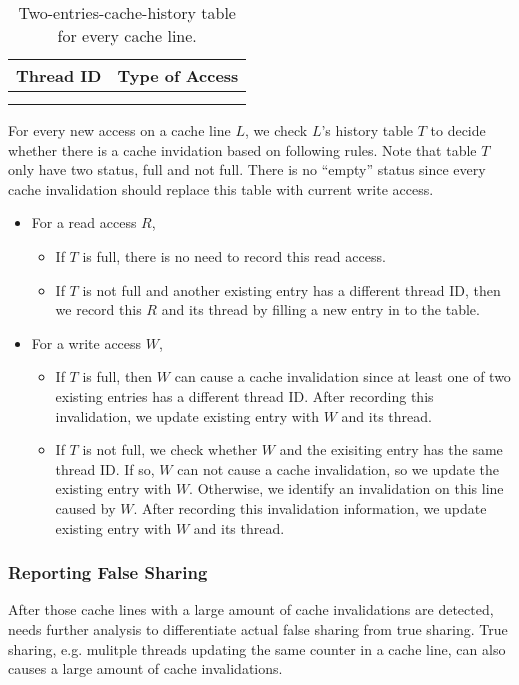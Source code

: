 \begin{table}
\centering
  \begin{tabular}{ l | r }
    \hline
    {Thread ID} & {Type of Access} \\ \hline
    \hline
     &   \\ \hline
     &   \\ \hline
  \end{tabular}
  \caption{Two-entries-cache-history table for every cache line. \label{table:cachehistory}}
\end{table} 


For every new access on a cache line $L$, we check $L$'s history table
$T$ to decide whether there is a cache invidation based on following rules.
Note that table $T$ only have two status, full and not full. 
There is no ``empty'' status since every cache invalidation should 
replace this table with current write access.

\begin{itemize}
\item
  For a read access $R$, 
  \begin{itemize}
    \item
      If $T$ is full, there is no need to record this read access.
    \item
      If $T$ is not full and another existing entry has a different thread
      ID, then we record this $R$ and its thread by filling a new entry in to the table. 
  \end{itemize}
\item
  For a write access $W$, 
  \begin{itemize}
    \item
      If $T$ is full, then $W$ can cause a cache invalidation since at least 
      one of two existing entries has a different thread ID.
      After recording this invalidation, we update 
      existing entry with $W$ and its thread.
    \item
      If $T$ is not full,
      we check whether $W$ and the exisiting entry has the same thread ID. If
      so, $W$ can not cause a cache invalidation, so we update the existing
      entry with $W$. Otherwise, we identify an invalidation on this line caused by $W$. 
      After recording this invalidation information, we update 
      existing entry with $W$ and its thread.
  \end{itemize}
\end{itemize}

\subsubsection{Reporting False Sharing}
After those cache lines with a large amount of cache invalidations are detected,
\Predator{} needs further analysis to differentiate actual false sharing from true sharing. 
True sharing, e.g. mulitple threads updating 
the same counter in a cache line, can also causes a large amount of cache invalidations.


